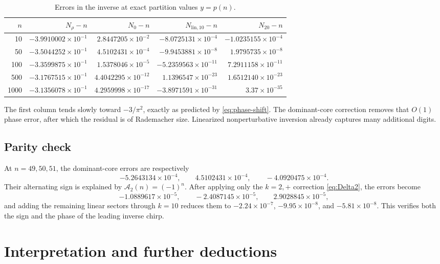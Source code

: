 \documentclass[11pt,a4paper]{article}
\numberwithin{equation}{section}
\theoremstyle{definition}
\theoremstyle{remark}
\newcommand{\Acal}{\mathcal A}
\begin{document}
\begin{table}[htbp]
\centering
\small
\caption{Errors in the inverse at exact partition values $y=p(n)$.}
\label{tab:inverse-errors}
\begin{tabular}{r@{\quad}rrrr}
\toprule
$n$ & $N_\rho-n$ & $N_0-n$ & $N_{\mathrm{lin},10}-n$ & $N_{20}-n$\\
\midrule
10   & $-3.9910002\!\times10^{-1}$ & $ 2.8447205\!\times10^{-2}$ & $-8.0725131\!\times10^{-4}$ & $-1.0235155\!\times10^{-4}$\\
50   & $-3.5044252\!\times10^{-1}$ & $ 4.5102431\!\times10^{-4}$ & $-9.9453881\!\times10^{-8}$ & $ 1.9795735\!\times10^{-8}$\\
100  & $-3.3599875\!\times10^{-1}$ & $ 1.5378046\!\times10^{-5}$ & $-5.2359563\!\times10^{-11}$ & $ 7.2911158\!\times10^{-11}$\\
500  & $-3.1767515\!\times10^{-1}$ & $ 4.4042295\!\times10^{-12}$ & $ 1.1396547\!\times10^{-23}$ & $ 1.6512140\!\times10^{-23}$\\
1000 & $-3.1356078\!\times10^{-1}$ & $ 4.2959998\!\times10^{-17}$ & $-3.8971591\!\times10^{-31}$ & $ 3.37\!\times10^{-35}$\\
\bottomrule
\end{tabular}
\end{table}

The first column tends slowly toward $-3/\pi^2$, exactly as predicted by
\eqref{eq:phase-shift}.  The dominant-core correction removes that $O(1)$
phase error, after which the residual is of Rademacher size.  Linearized
nonperturbative inversion already captures many additional digits.

\subsection{Parity check}

At $n=49,50,51$, the dominant-core errors are respectively
\[
 -5.2643134\times10^{-4},\qquad
  4.5102431\times10^{-4},\qquad
 -4.0920475\times10^{-4}.
\]
Their alternating sign is explained by
$\Acal_2(n)=(-1)^n$.  After applying only the $k=2,+$ correction
\eqref{eq:Delta2}, the errors become
\[
 -1.0889617\times10^{-5},\qquad
 -2.4087145\times10^{-5},\qquad
  2.9028845\times10^{-5},
\]
and adding the remaining linear sectors through $k=10$ reduces them to
$-2.24\times10^{-7}$, $-9.95\times10^{-8}$, and $-5.81\times10^{-8}$.
This verifies both the sign and the phase of the leading inverse chirp.

\section{Interpretation and further deductions}
\end{document}
